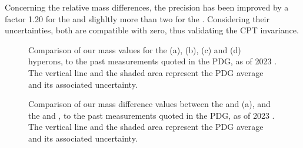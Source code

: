 Concerning the relative mass differences, the precision has been improved by a factor 1.20 for the \rmXiPM and slighltly more than two for the \rmOmegaPM. Considering their uncertainties, both are compatible with zero, thus validating the CPT invariance.

\begin{figure}[h]
\hspace*{-2cm}
\hspace*{-2cm}
\caption{Comparison of our mass values for the \rmXiM (a), \rmAxiP (b), \rmOmegaM (c) and \rmAomegaP (d) hyperons, to the past measurements quoted in the PDG, as of 2023 \cite{particledatagroupReviewParticlePhysics2022}. The vertical line and the shaded area represent the PDG average and its associated uncertainty.}
	\label{fig:MassVsPDG}
\end{figure}

\begin{figure}[h]
\hspace*{-2cm}
\caption{Comparison of our mass difference values between the \rmXiM and \rmAxiP (a), and the \rmOmegaM and \rmAomegaP, to the past measurements quoted in the PDG, as of 2023 \cite{particledatagroupReviewParticlePhysics2022}. The vertical line and the shaded area represent the PDG average and its associated uncertainty.}
	\label{fig:MassDiffVsPDG}
\end{figure}
